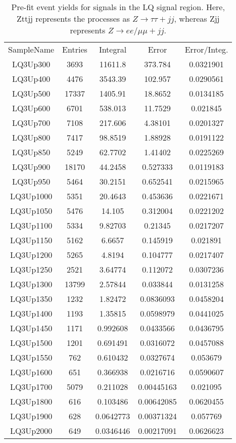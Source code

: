\begin{table}
\centering
\begin{tabular}{|c|c|c|c|c|}
\hline
\hline
SampleName & Entries & Integral  &    Error    & Error/Integ.\\
LQ3Up300   &  3693   &   11611.8 &    373.784  & 0.0321901 \\
LQ3Up400   &  4476   &   3543.39 &    102.957  & 0.0290561 \\
LQ3Up500   & 17337   &   1405.91 &    18.8652  & 0.0134185 \\
LQ3Up600   &  6701   &   538.013 &    11.7529  &  0.021845 \\
LQ3Up700   &  7108   &   217.606 &    4.38101  & 0.0201327 \\
LQ3Up800   &  7417   &   98.8519 &    1.88928  & 0.0191122 \\
LQ3Up850   &  5249   &   62.7702 &    1.41402  & 0.0225269 \\
LQ3Up900   & 18170   &   44.2458 &   0.527333  & 0.0119183 \\
LQ3Up950   &  5464   &   30.2151 &   0.652541  & 0.0215965 \\
LQ3Up1000  &  5351   &   20.4643 &   0.453636  & 0.0221671 \\
LQ3Up1050  &  5476   &    14.105 &   0.312004  & 0.0221202 \\
LQ3Up1100  &  5334   &   9.82703 &    0.21345  & 0.0217207 \\
LQ3Up1150  &  5162   &    6.6657 &   0.145919  &  0.021891 \\
LQ3Up1200  &  5265   &    4.8194 &   0.104777  & 0.0217407 \\
LQ3Up1250  &  2521   &   3.64774 &   0.112072  & 0.0307236 \\
LQ3Up1300  & 13799   &   2.57844 &   0.033844  & 0.0131258 \\
LQ3Up1350  &  1232   &   1.82472 &  0.0836093  & 0.0458204 \\
LQ3Up1400  &  1193   &   1.35815 &  0.0598979  & 0.0441025 \\
LQ3Up1450  &  1171   &  0.992608 &  0.0433566  & 0.0436795 \\
LQ3Up1500  &  1201   &  0.691491 &  0.0316072  & 0.0457088 \\
LQ3Up1550  &   762   &  0.610432 &  0.0327674  &  0.053679 \\
LQ3Up1600  &   651   &  0.366938 &  0.0216716  & 0.0590607 \\
LQ3Up1700  &  5079   &  0.211028 & 0.00445163  &  0.021095 \\
LQ3Up1800  &   616   &  0.103486 & 0.00642085  & 0.0620455 \\
LQ3Up1900  &   628   & 0.0642773 & 0.00371324  &  0.057769 \\
LQ3Up2000  &   649   & 0.0346446 & 0.00217091  & 0.0626623 \\
\hline
\hline
\end{tabular}
\caption{Pre-fit event yields for signals in the LQ \hadhad signal region. Here, Zttjj represents the processes as $Z\rightarrow\tau\tau + jj$,
whereas Zjj represents  $Z\rightarrow ee/\mu\mu + jj$.}
\label{tab:LQHadHadYields_signal}
\end{table}

